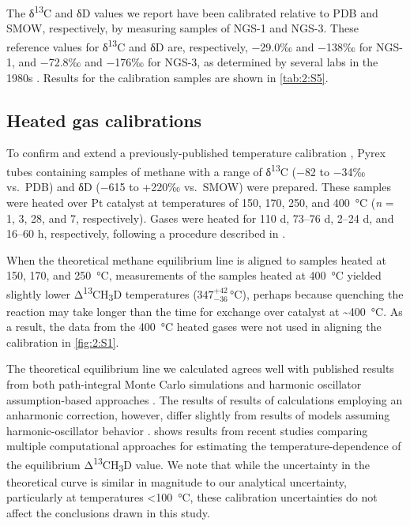 The δ\textsuperscript{13}C and δD values we report have been calibrated
relative to PDB and SMOW, respectively, by measuring samples of NGS-1
and NGS-3. These reference values for δ\textsuperscript{13}C and δD are,
respectively, $-$29.0‰ and $-$138‰ for NGS-1, and $-$72.8‰ and $-$176‰ for
NGS-3, as determined by several labs in the 1980s \parencite{Hut_1987}. Results for the calibration
samples are shown in \autoref{tab:2:S5}.

\subsection{Heated gas calibrations}\label{heated-gas-calibrations}

To confirm and extend a previously-published temperature calibration
\parencite{Ono++_2014_AC}, Pyrex tubes containing samples of methane with a range of
δ\textsuperscript{13}C ($-$82 to $-$34‰ vs.\ PDB) and δD ($-$615 to +220‰ vs.\ SMOW) were prepared. These samples were heated over Pt catalyst at
temperatures of 150, 170, 250, and 400~°C (\emph{n} = 1, 3, 28, and 7,
respectively). Gases were heated for 110 d, 73--76 d, 2--24 d, and
16--60 h, respectively, following a procedure described in 
\textcite{Ono++_2014_AC}.

When the theoretical methane equilibrium line is aligned to samples
heated at 150, 170, and 250~°C, measurements of the samples heated at
400~°C yielded slightly lower Δ\textsuperscript{13}CH\textsubscript{3}D
temperatures
($347^{+42}_{-36}$\,°C),
perhaps because quenching the reaction may take longer than the time for
exchange over catalyst at \textasciitilde{}400~°C. As a result, the data
from the 400~°C heated gases were not used in aligning the calibration
in \autoref{fig:2:S1}.

The theoretical equilibrium line we calculated agrees well with
published results from both path-integral Monte Carlo simulations
\parencite{Webb+Miller_2013_JPCA} and harmonic oscillator assumption-based approaches
\parencite{Webb+Miller_2013_JPCA,Cao+Liu_2012_GCA,Ma++_2008_GCA}. The results of results of calculations employing
an anharmonic correction, however, differ slightly from results of
models assuming harmonic-oscillator behavior \parencite[by \textasciitilde{}0.3‰
near room temperature;][]{Webb+Miller_2013_JPCA,Cao+Liu_2012_GCA}.  shows results
from recent studies comparing multiple
computational approaches for estimating the temperature-dependence of
the equilibrium Δ\textsuperscript{13}CH\textsubscript{3}D value. We note
that while the uncertainty in the theoretical curve is similar in
magnitude to our analytical uncertainty, particularly at temperatures
\textless{}100~°C, these calibration uncertainties do not affect the
conclusions drawn in this study.

